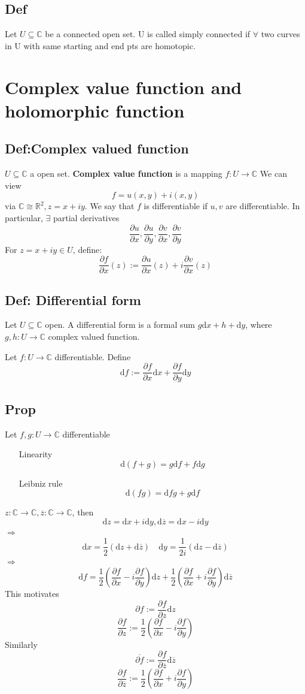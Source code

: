\documentclass{book}
\begin{document}
\section{Def}
Let $U\subseteq \mathbb C$ be a connected open set. U is called simply connected if $\forall$ two curves in U with same starting and end pts are homotopic.
\chapter{Complex value function and holomorphic function}
\section{Def:Complex valued function}
$U\subseteq \mathbb C$ a open set. \textbf{Complex value function} is a mapping $f:U\rightarrow \mathbb C$ We can view $$f=u(x,y)+i(x,y)$$ via $\mathbb C\cong\mathbb R^2, z=x+iy$. We say that $f$ is differentiable if $u,v$ are differentiable. In particular, $\exists$ partial derivatives $$\frac{\partial u}{\partial x},\frac{\partial u}{\partial y},\frac{\partial v}{\partial x},\frac{\partial v}{\partial y}$$
For $z=x+iy\in U$, define:
$$\frac{\partial f}{\partial x}(z):=\frac{\partial u}{\partial x}(z)+i\frac{\partial v}{\partial x}(z)$$
\section{Def: Differential form}
Let $U\subseteq \mathbb C$ open. A differential form is a formal sum $g\text{d}x+h+\text{d}y$, where $g,h:U\rightarrow \mathbb C$ complex valued function.

Let $f:U\rightarrow \mathbb C$ differentiable. Define $$\text{d}f:=\frac{\partial f}{\partial x}\text{d}x+\frac{\partial f}{\partial y}\text{d}y$$
\section{Prop}
Let $f,g:U\rightarrow \mathbb C$ differentiable
\begin{itemize}
    \item[Linearity] $$\text{d}(f+g)=g\text{d}f+f\text{d}g$$
    \item[Leibniz rule]$$\text{d}(fg)=\text{d}f g+g\text{d}f$$ 
\end{itemize}

$z:\mathbb C\rightarrow\mathbb C,\overline z:\mathbb C\rightarrow \mathbb C$, then 
$$\text{d}z=\text{d}x+i\text{d}y,\text{d}\overline z=\text{d}x-i\text{d}y$$
$\Rightarrow$$$\text{d}x=\frac{1}2(\text{d}z+\text{d}\overline z)\quad \text{d}y=\frac{1}{2i}(\text{d}z-\text{d}\overline z)$$
$\Rightarrow$$$\text{d}f=\frac{1}2(\frac{\partial f}{\partial x}-i\frac{\partial f}{\partial y})\text{d}z+\frac{1}2(\frac{\partial f}{\partial x}+i\frac{\partial f}{\partial y})\text{d}\overline z$$
This motivates $$\partial f:=\frac{\partial f}{\partial z}\text{d}z$$
$$\frac{\partial f}{\partial z}:=\frac{1}2(\frac{\partial f}{\partial x}-i\frac{\partial f}{\partial y})$$
Similarly$$\overline{\partial f}:=\frac{\partial f}{\partial\overline z}\text{d}\overline z$$
$$\frac{\partial f}{\partial\overline z}:=\frac{1}2(\frac{\partial f}{\partial x}+i\frac{\partial f}{\partial y})$$
\end{document}
